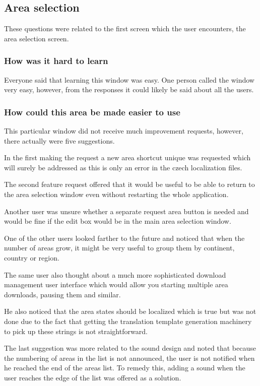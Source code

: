 \documentclass[nolof,digital]{fithesis3}
\begin{document}
\subsection{Area selection}
These questions were related to the first screen which the user encounters, the area selection screen.
\subsubsection{How was it hard to learn}
Everyone said that learning this window was easy. One person called the window very easy, however, from the responses it could likely be said about all the users.
\subsubsection{How could this area be made easier to use}
This particular window did not receive much improvement requests, however, there actually were five suggestions.

In the first making the request a new area shortcut unique was requested which will surely be addressed as this is only an error in the czech localization files.

The second feature request offered that it would be useful to be able to return to the area selection window even without restarting the whole application.

Another user was unsure whether a separate request area button is needed and would be fine if the edit box would be in the main area selection window.

One of the other users looked farther to the future and noticed that when the number of areas grow, it might be very useful to group them by continent, country or region.

The same user also thought about a much more sophisticated download management user interface which would allow you starting multiple area downloads, pausing them and similar.

He also noticed that the area states should be localized which is true but was not done due to the fact that getting the translation template generation machinery to pick up these strings is not straightforward.

The last suggestion was more related to the sound design and noted that because the numbering of areas in the list is not announced, the user is not notified when he reached the end of the areas list. To remedy this, adding a sound when the user reaches the edge of the list was offered as a solution.
\end{document}
